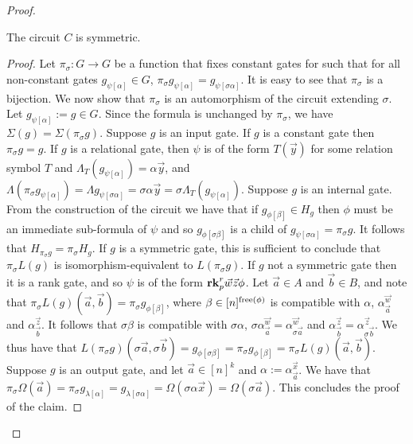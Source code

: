 \documentclass[../paper.tex]{subfiles}
\begin{document}
\begin{proof}
\begin{claim}
  The circuit $C$ is symmetric.
\end{claim}
\begin{proof}
  Let $\pi_\sigma : G \rightarrow G$ be a function that fixes constant gates for
  such that for all non-constant gates $g_{\psi[\alpha]} \in G$, $\pi_{\sigma}
  g_{\psi [\alpha]} = g_{\psi[\sigma \alpha]}$. It is easy to see that
  $\pi_\sigma$ is a bijection. We now show that $\pi_{\sigma}$ is an
  automorphism of the circuit extending $\sigma$. Let $g_{\psi[\alpha]} := g \in
  G$. Since the formula is unchanged by $\pi_\sigma$, we have $\Sigma(g) =
  \Sigma (\pi_{\sigma} g)$. Suppose $g$ is an input gate. If $g$ is a constant
  gate then $\pi_\sigma g = g$. If $g$ is a relational gate, then $\psi$ is of
  the form $T(\vec{y})$ for some relation symbol $T$ and $\Lambda_T
  (g_{\psi[\alpha]}) = \alpha \vec{y}$, and $\Lambda (\pi_{\sigma}
  g_{\psi[\alpha]}) = \Lambda g_{\psi[\sigma \alpha]} = \sigma \alpha \vec{y} =
  \sigma \Lambda_T (g_{\psi[\alpha]})$. Suppose $g$ is an internal gate. From
  the construction of the circuit we have that if $g_{\phi[\beta]} \in H_g$ then
  $\phi$ must be an immediate sub-formula of $\psi$ and so $g_{\phi[\sigma
    \beta]}$ is a child of $g_{\psi[\sigma \alpha]} = \pi_{\sigma} g$. It
  follows that $H_{\pi_\sigma g} = \pi_\sigma H_g$. If $g$ is a symmetric gate,
  this is sufficient to conclude that $\pi_{\sigma} L(g)$ is
  isomorphism-equivalent to $L(\pi_{\sigma} g)$. If $g$ not a symmetric gate
  then it is a rank gate, and so $\psi$ is of the form $\text{\textbf{rk}}^r_p \vec{w}
  \vec{z} \phi$. Let $\vec{a} \in A$ and $\vec{b} \in B$, and note that
  $\pi_\sigma L(g) (\vec{a}, \vec{b}) = \pi_{\sigma} g_{\phi[\beta]}$, where
  $\beta \in [n]^{\mathrm{free}(\phi)}$ is compatible with $\alpha$,
  $\alpha^{\vec{w}}_{\vec{a}}$ and $\alpha^{\vec{z}}_{\vec{b}}$. It follows that
  $\sigma \beta$ is compatible with $\sigma \alpha$, $\sigma
  \alpha^{\vec{w}}_{\vec{a}} = \alpha^{\vec{w}}_{\sigma \vec{a}}$ and
  $\alpha^{\vec{z}}_{\vec{b}} = \alpha^{\vec{z}}_{\sigma \vec{b}}$. We thus have
  that $L(\pi_{\sigma} g)(\sigma \vec{a}, \sigma \vec{b}) = g_{\phi[\sigma
    \beta]} = \pi_{\sigma} g_{\phi[\beta]} = \pi_{\sigma} L(g)(\vec{a},
  \vec{b})$. Suppose $g$ is an output gate, and let $\vec{a} \in [n]^k$ and
  $\alpha := \alpha^{\vec{x}}_{\vec{a}}$. We have that $\pi_{\sigma} \Omega
  (\vec{a}) = \pi_\sigma g_{\lambda[\alpha]} = g_{\lambda[\sigma \alpha]} =
  \Omega (\sigma \alpha \vec{x}) = \Omega (\sigma \vec{a})$. This concludes the
  proof of the claim.
\end{proof}
  

\end{proof}
\end{document}
